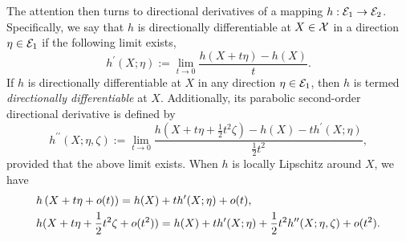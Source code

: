 The attention then turns to directional derivatives of a mapping $h:\mathcal{E}_1\to\mathcal{E}_2$. Specifically, we say that $h$ is directionally differentiable at $X\in\mathcal{X}$ in a direction $\eta\in\mathcal{E}_1$ if the following limit exists,
\begin{equation*}
    h^\prime(X;\eta):=\lim_{t\to 0}\frac{h(X+t\eta)-h(X)}{t}.
\end{equation*}
If $h$ is directionally differentiable at $X$ in any direction $\eta\in\mathcal{E}_1$, then $h$ is termed \emph{directionally differentiable} at $X$. Additionally, its parabolic second-order directional derivative is defined by
\begin{equation*}
    h^{\prime\prime}(X;\eta,\zeta):=\lim_{t\to 0}\frac{h(X+t\eta+\frac{1}{2}t^2\zeta)-h(X)-th^\prime(X;\eta)}{\frac{1}{2}t^2},
\end{equation*}
provided that the above limit exists. When $h$ is locally Lipschitz around $X$, we have
\begin{align}
    &h\left( {X+t\eta+o(t)} \right) = h(X) + th^\prime(X;\eta)+o(t),    \label{eq:first_order_exp}
    \\
    &h(X+t\eta+\frac{1}{2}t^2\zeta+o(t^2)) = h(X)+th^\prime(X;\eta)+ \frac{1}{2}t^2h^{\prime\prime}(X;\eta,\zeta) + o(t^2). \label{eq:second_order_exp}
\end{align}

